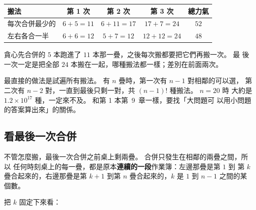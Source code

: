 \begin{center}
\begin{tabular}{lccc|c}
\toprule
搬法 & 第 1 次 & 第 2 次 & 第 3 次 & 總力氣 \\
\midrule
每次合併最少的 & $6 + 5 = 11$ & $6 + 11 = 17$ & $17 + 7 = 24$ & $52$ \\
左右各合一半 & $6 + 6 = 12$ & $5 + 7 = 12$ & $12 + 12 = 24$ & $48$ \\
\bottomrule
\end{tabular}
\end{center}

貪心先合併的 $5$ 本跑進了 $11$ 本那一疊，之後每次搬都要把它們再搬一次。 最
後一次一定是把全部 $24$ 本搬在一起，哪種搬法都一樣；差別在前面兩次。

最直接的做法是試遍所有搬法。 有 $n$ 疊時，第一次有 $n - 1$ 對相鄰的可以選，
第二次有 $n - 2$ 對，一直到最後只剩一對，共 $(n - 1)!$ 種搬法。 $n = 20$ 時
大約是 $1.2 \times 10^{17}$ 種，一定來不及。 和第 1 本第~9~章一樣，要找「大問題可
以用小問題的答案算出來」的關係。

\subsection{看最後一次合併}
\label{sec:ivdp-last}

不管怎麼搬，最後一次合併之前桌上剩兩疊。 合併只發生在相鄰的兩疊之間，所以
任何時刻桌上的每一疊，都是原本\textbf{連續的一段}作業簿：左邊那疊是第 $1$ 到
第 $k$ 疊合起來的，右邊那疊是第 $k + 1$ 到第 $n$ 疊合起來的，$k$ 是
$1$ 到 $n - 1$ 之間的某個數。

\begin{center}
\label{fig:ivdp-last}
\end{center}

把 $k$ 固定下來看：

